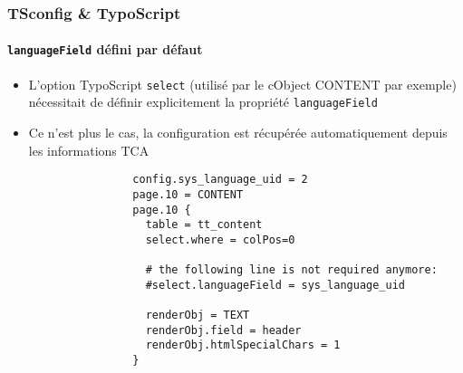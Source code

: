 \begin{frame}[fragile]
	\frametitle{TSconfig \& TypoScript}
	\framesubtitle{\texttt{languageField} défini par défaut}

	\lstset{basicstyle=\tiny\ttfamily}

	\begin{itemize}

		\item L'option TypoScript \texttt{select} (utilisé par le cObject CONTENT par exemple) nécessitait de définir
			explicitement la propriété \texttt{languageField}

		\item Ce n'est plus le cas, la configuration est récupérée automatiquement depuis les informations TCA


			\begin{lstlisting}
				config.sys_language_uid = 2
				page.10 = CONTENT
				page.10 {
				  table = tt_content
				  select.where = colPos=0

				  # the following line is not required anymore:
				  #select.languageField = sys_language_uid

				  renderObj = TEXT
				  renderObj.field = header
				  renderObj.htmlSpecialChars = 1
				}
			\end{lstlisting}

	\end{itemize}

\end{frame}

